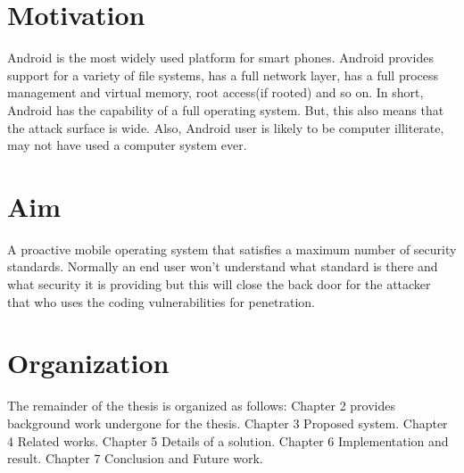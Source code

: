 \section{Motivation}
Android is the most widely used platform for smart phones. Android
provides support for a variety of file systems, has a full network layer,
has a full process management and virtual memory, root access(if rooted) and so on. In short, Android has the capability of a full operating system.
But, this also means that the attack surface is wide. Also, Android user is likely to be computer illiterate, may not have used a
computer system ever.
\section{Aim}
A proactive mobile operating system that satisfies a maximum number of security standards. Normally an end user won't understand what standard is there and what security it is providing but this will close the back door for the attacker that who uses the coding vulnerabilities for penetration.   
\section{Organization}
The remainder of the thesis is organized as follows: Chapter 2 provides background work undergone for the
thesis. Chapter 3 Proposed system. Chapter 4 Related works.
Chapter 5 Details of a solution. Chapter 6 Implementation and result. Chapter 7 Conclusion and Future work.
